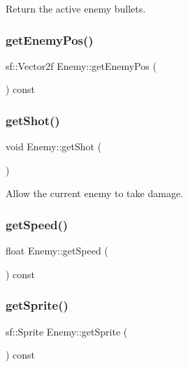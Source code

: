 Return the active enemy bullets. 

\mbox{\label{class_enemy_a9f5b6b7b70f7f3532e82eebcab2e26e8}} 
\subsubsection{\texorpdfstring{get\+Enemy\+Pos()}{getEnemyPos()}}
{\footnotesize\ttfamily sf\+::\+Vector2f Enemy\+::get\+Enemy\+Pos (\begin{DoxyParamCaption}{ }\end{DoxyParamCaption}) const\hspace{0.3cm}{\ttfamily [inline]}}

\mbox{\label{class_enemy_a2faee7be0abbf8d473ecd6d7ee084e60}} 
\subsubsection{\texorpdfstring{get\+Shot()}{getShot()}}
{\footnotesize\ttfamily void Enemy\+::get\+Shot (\begin{DoxyParamCaption}{ }\end{DoxyParamCaption})}



Allow the current enemy to take damage. 

\mbox{\label{class_enemy_a342051a8cf9fe6e329774e37af486fca}} 
\subsubsection{\texorpdfstring{get\+Speed()}{getSpeed()}}
{\footnotesize\ttfamily float Enemy\+::get\+Speed (\begin{DoxyParamCaption}{ }\end{DoxyParamCaption}) const\hspace{0.3cm}{\ttfamily [inline]}}

\mbox{\label{class_enemy_a8f769acc8f473846d11eaabf504a1089}} 
\subsubsection{\texorpdfstring{get\+Sprite()}{getSprite()}}
{\footnotesize\ttfamily sf\+::\+Sprite Enemy\+::get\+Sprite (\begin{DoxyParamCaption}{ }\end{DoxyParamCaption}) const}



